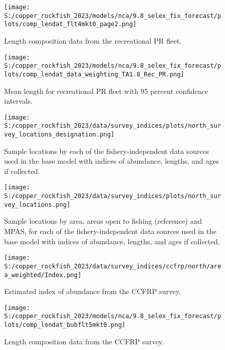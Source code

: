 \documentclass[
  letterpaper,
]{article}
\begin{document}
\pagebreak

\begin{figure}
\centering
\texttt{[image: S:/copper\_rockfish\_2023/models/nca/9.8\_selex\_fix\_forecast/plots/comp\_lendat\_flt4mkt0\_page2.png]}
\caption{Length composition data from the recreational PR fleet.\label{fig:rec-pr-len-data}}
\end{figure}

\pagebreak

\begin{figure}
\centering
\texttt{[image: S:/copper\_rockfish\_2023/models/nca/9.8\_selex\_fix\_forecast/plots/comp\_lendat\_data\_weighting\_TA1.8\_Rec\_PR.png]}
\caption{Mean length for recreational PR fleet with 95 percent confidence intervals.\label{fig:mean-rec-pr-len-data}}
\end{figure}

\pagebreak

\begin{figure}
\centering
\texttt{[image: S:/copper\_rockfish\_2023/data/survey\_indices/plots/north\_survey\_locations\_designation.png]}
\caption{Sample locations by each of the fishery-independent data sources used in the base model with indices of abundance, lengths, and ages if collected.\label{fig:survey-locations}}
\end{figure}

\pagebreak

\begin{figure}
\centering
\texttt{[image: S:/copper\_rockfish\_2023/data/survey\_indices/plots/north\_survey\_locations.png]}
\caption{Sample locations by area, areas open to fishing (reference) and MPAS, for each of the fishery-independent data sources used in the base model with indices of abundance, lengths, and ages if collected.\label{fig:ref-mpa}}
\end{figure}

\pagebreak

\begin{figure}
\centering
\texttt{[image: S:/copper\_rockfish\_2023/data/survey\_indices/ccfrp/north/area\_weighted/Index.png]}
\caption{Estimated index of abundance from the CCFRP survey.\label{fig:ccfrp-index-main}}
\end{figure}

\pagebreak

\begin{figure}
\centering
\texttt{[image: S:/copper\_rockfish\_2023/models/nca/9.8\_selex\_fix\_forecast/plots/comp\_lendat\_bubflt5mkt0.png]}
\caption{Length composition data from the CCFRP survey.\label{fig:ccfrp-len-data}}
\end{figure}
\end{document}
